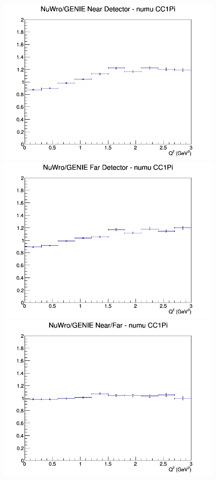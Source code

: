 \begin{figure}[h]
\endminipage
\newline
{}
\includegraphics[width=\linewidth]{Q2/nominal/ratios/CC1Pi_NuWro_GENIE_numu_near_Q2.png}
\endminipage
{}
\includegraphics[width=\linewidth]{Q2/nominal/ratios/CC1Pi_NuWro_GENIE_numu_far_Q2.png}
\endminipage
{}
\includegraphics[width=\linewidth]{Q2/nominal/ratios/CC1Pi_NuWro_GENIE_numu_NF_Q2.png}
\endminipage
\newline
\end{figure}
\clearpage
